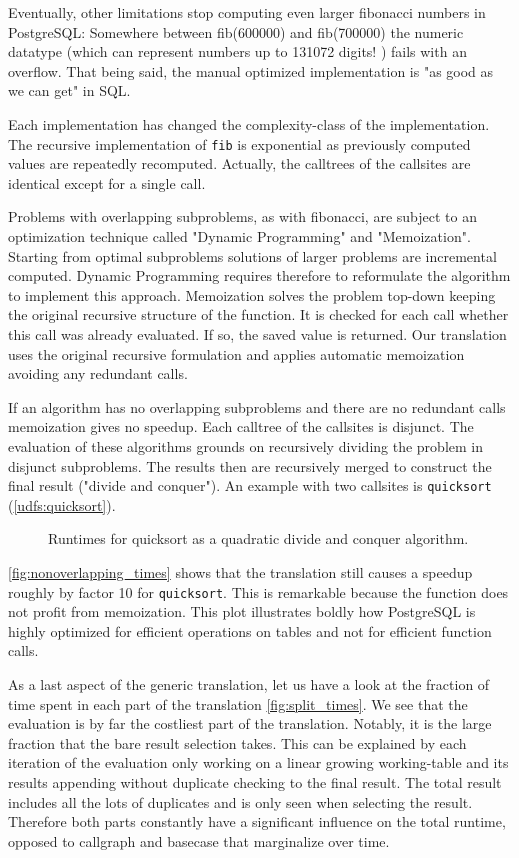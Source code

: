 Eventually, other limitations stop computing even larger fibonacci numbers in PostgreSQL: Somewhere between fib(600000) and fib(700000) the numeric datatype (which can represent numbers up to 131072 digits! \cite[p. 124 f.]{psql}) fails with an overflow. That being said, the manual optimized implementation is "as good as we can get" in SQL.

Each implementation has changed the complexity-class of the implementation. The recursive implementation of \texttt{fib} is exponential \cite{} as previously computed values are repeatedly recomputed. Actually, the calltrees of the callsites are identical except for a single call.

Problems with overlapping subproblems, as with fibonacci, are subject to an optimization technique called "Dynamic Programming" and "Memoization". Starting from optimal subproblems solutions of larger problems are incremental computed. Dynamic Programming requires therefore to reformulate the algorithm to implement this approach. Memoization solves the problem top-down keeping the original recursive structure of the function. It is checked for each call whether this call was already evaluated. If so, the saved value is returned. Our translation uses the original recursive formulation and applies automatic memoization avoiding any redundant calls.

If an algorithm has no overlapping subproblems and there are no redundant calls memoization gives no speedup. Each calltree of the callsites is disjunct. The evaluation of these algorithms grounds on recursively dividing the problem in disjunct subproblems. The results then are recursively merged to construct the final result ("divide and conquer"). An example with two callsites is \texttt{quicksort} (\autoref{udfs:quicksort}).

\begin{figure}[h!]
    \centering\small
    
    \caption{Runtimes for quicksort as a quadratic divide and conquer algorithm.}
    \label{fig:nonoverlapping_times}
\end{figure}

\autoref{fig:nonoverlapping_times} shows that the translation still causes a speedup roughly by factor 10 for \texttt{quicksort}. This is remarkable because the function does not profit from memoization. This plot illustrates boldly how PostgreSQL is highly optimized for efficient operations on tables and not for efficient function calls.

As a last aspect of the generic translation, let us have a look at the fraction of time spent in each part of the translation \autoref{fig:split_times}. We see that the evaluation is by far the costliest part of the translation. Notably, it is the large fraction that the bare result selection takes. This can be explained by each iteration of the evaluation only working on a linear growing working-table and its results appending without duplicate checking to the final result. The total result includes all the lots of duplicates and is only seen when selecting the result. Therefore both parts constantly have a significant influence on the total runtime, opposed to callgraph and basecase that marginalize over time.


